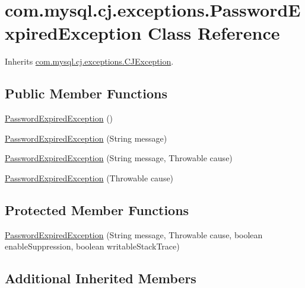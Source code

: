 \hypertarget{classcom_1_1mysql_1_1cj_1_1exceptions_1_1_password_expired_exception}{}\section{com.\+mysql.\+cj.\+exceptions.\+Password\+Expired\+Exception Class Reference}
\label{classcom_1_1mysql_1_1cj_1_1exceptions_1_1_password_expired_exception}


Inherits \mbox{\hyperlink{classcom_1_1mysql_1_1cj_1_1exceptions_1_1_c_j_exception}{com.\+mysql.\+cj.\+exceptions.\+C\+J\+Exception}}.

\subsection*{Public Member Functions}
\begin{DoxyCompactItemize}
\item 
\mbox{\hyperlink{classcom_1_1mysql_1_1cj_1_1exceptions_1_1_password_expired_exception_a169603786a6a02d67a65a3c4d2cb453f}{Password\+Expired\+Exception}} ()
\item 
\mbox{\hyperlink{classcom_1_1mysql_1_1cj_1_1exceptions_1_1_password_expired_exception_a52e87a9556ee15fcbf7e69b70b3a1561}{Password\+Expired\+Exception}} (String message)
\item 
\mbox{\hyperlink{classcom_1_1mysql_1_1cj_1_1exceptions_1_1_password_expired_exception_ab361a6992f2ac423def739b32eb6009a}{Password\+Expired\+Exception}} (String message, Throwable cause)
\item 
\mbox{\hyperlink{classcom_1_1mysql_1_1cj_1_1exceptions_1_1_password_expired_exception_a78248d7bc682dd450eeb1125e0ac24b9}{Password\+Expired\+Exception}} (Throwable cause)
\end{DoxyCompactItemize}
\subsection*{Protected Member Functions}
\begin{DoxyCompactItemize}
\item 
\mbox{\hyperlink{classcom_1_1mysql_1_1cj_1_1exceptions_1_1_password_expired_exception_a2b380747747565c5cf7f6be986ca0b0a}{Password\+Expired\+Exception}} (String message, Throwable cause, boolean enable\+Suppression, boolean writable\+Stack\+Trace)
\end{DoxyCompactItemize}
\subsection*{Additional Inherited Members}


